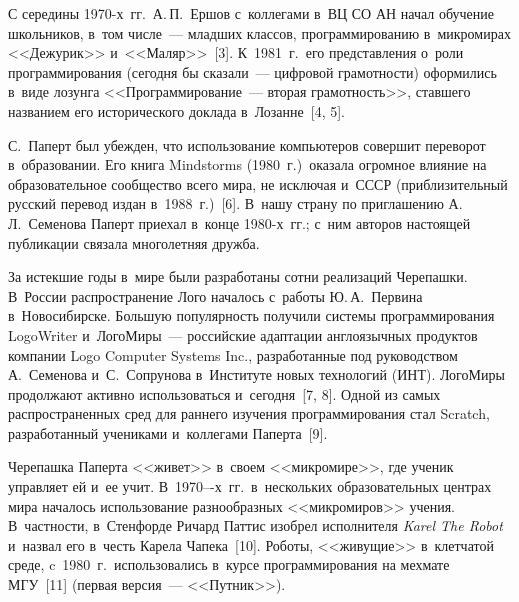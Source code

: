 \begin{multicols}{2}
  С середины 1970-х~гг.\ А.\,П.~Ершов с~коллегами в~ВЦ СО АН начал 
обучение школьников, в~том чис\-ле~---  младших классов, программированию 
в~мик\-ро\-ми\-рах <<Дежурик>> и~<<Маляр>>~[3]. К~1981~г.\ его представления 
о~роли программирования (сегодня  бы сказали~--- цифровой грамотности) 
оформились в~виде лозунга <<Программирование~--- вторая грамотность>>, 
ставшего названием его исторического доклада в~Лозанне~[4, 5].
  
  С.~Паперт был убежден, что использование компьютеров совершит 
переворот в~образовании. Его книга Mindstorms (1980~г.)\ оказала огромное 
влияние на образовательное сообщество всего мира, не исключая и~СССР 
(приблизительный русский перевод издан в~1988~г.)~[6]. В~нашу страну по 
приглашению А.\,Л.~Семенова Паперт приехал в~конце 1980-х~гг.; с~ним 
авторов настоящей публикации связала многолетняя дружба.
  
  За истекшие годы в~мире были разработаны сотни реализаций Черепашки. 
В~России распространение Лого началось с~работы Ю.\,А.~Первина 
в~Новосибирске. Большую популярность получили \mbox{системы} программирования 
LogoWriter и~\mbox{ЛогоМиры}~--- российские адаптации англоязычных продуктов 
компании Logo Computer Systems Inc., разработанные под руководством 
А.~Семенова и~С.~Сопрунова в~Институте новых технологий (ИНТ). 
\mbox{ЛогоМиры} продолжают активно использоваться и~сегодня~[7, 8]. Одной из 
самых распространенных сред для раннего изучения программирования стал 
Scratch, разработанный учениками и~коллегами Паперта~[9].
  
  Черепашка Паперта <<живет>> в~своем <<микромире>>, где ученик 
управляет ей и~ее учит. 
 В~1970---х~гг.\ в~нескольких образовательных центрах 
мира началось использование разнообразных <<мик\-ро\-миров>> учения. 
В~част\-ности, в~Стенфорде Ричард Паттис изобрел исполнителя \textit{Karel 
The Robot} и~назвал его в~честь Карела Чапека~[10]. Роботы, <<живущие>> в~клетчатой среде,  
c~1980~г.\ использовались в~курсе программирования на мехмате МГУ~[11] 
(первая версия~--- <<Путник>>). 
  

\end{multicols}
